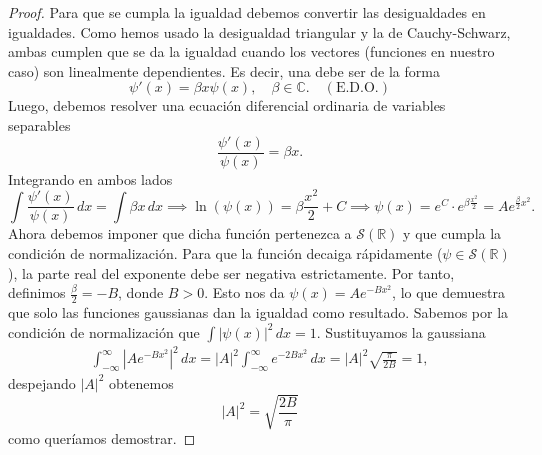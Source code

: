 \documentclass[12pt]{article}
\newcommand{\C}{\mathbb{C}}
\newcommand{\Sc}{\mathcal{S}(\mathbb{R})}
\theoremstyle{plain}
\theoremstyle{definition}
\numberwithin{equation}{section}
\begin{document}
\begin{proof}
            Para que se cumpla la igualdad debemos convertir las desigualdades en igualdades.
            Como hemos usado la desigualdad triangular y la de Cauchy-Schwarz, ambas cumplen que se da la igualdad cuando los vectores (funciones en nuestro caso) son linealmente dependientes. Es decir, una debe ser de la forma
            \begin{equation*}
                \psi'(x) = \beta x \psi(x), \quad \beta \in \C. \quad (\text{E.D.O.})
            \end{equation*}
            Luego, debemos resolver una ecuación diferencial ordinaria de variables separables
            \begin{equation*}
                \frac{\psi'(x)}{\psi(x)} = \beta x.
            \end{equation*}
            Integrando en ambos lados
            \begin{equation*}
                \int \frac{\psi'(x)}{\psi(x)} \,dx = \int \beta x \,dx \implies \ln(\psi(x)) = \beta \frac{x^2}{2} + C \implies \psi(x) = e^C \cdot e^{\beta \frac{x^2}{2}} = A e^{\frac{\beta}{2} x^2}.
            \end{equation*}
            Ahora debemos imponer que dicha función pertenezca a \(\Sc\) y que cumpla la condición de normalización.
            Para que la función decaiga rápidamente (\(\psi \in \Sc\)), la parte real del exponente debe ser negativa estrictamente. Por tanto, definimos \(\frac{\beta}{2} = -B\), donde \(B > 0\). Esto nos da \(\psi(x) = A e^{-Bx^2}\), lo que demuestra que solo las funciones gaussianas dan la igualdad como resultado.
            Sabemos por la condición de normalización que \(\int \left\lvert \psi(x) \right\rvert^2 \,dx = 1\). Sustituyamos la gaussiana
            \begin{align*}
                \int_{-\infty}^{\infty} \left\lvert A e^{-Bx^2} \right\rvert^2 \,dx = \left\lvert A \right\rvert^2 \int_{-\infty}^{\infty} e^{-2Bx^2} \,dx = \left\lvert A \right\rvert^2 \sqrt{\frac{\pi}{2B}} = 1,
            \end{align*}
            despejando \(\left\lvert A \right\rvert^2\) obtenemos $$ \left\lvert A \right\rvert^2 = \sqrt{\frac{2B}{\pi}} $$
            como queríamos demostrar.


\end{proof}
\end{document}
